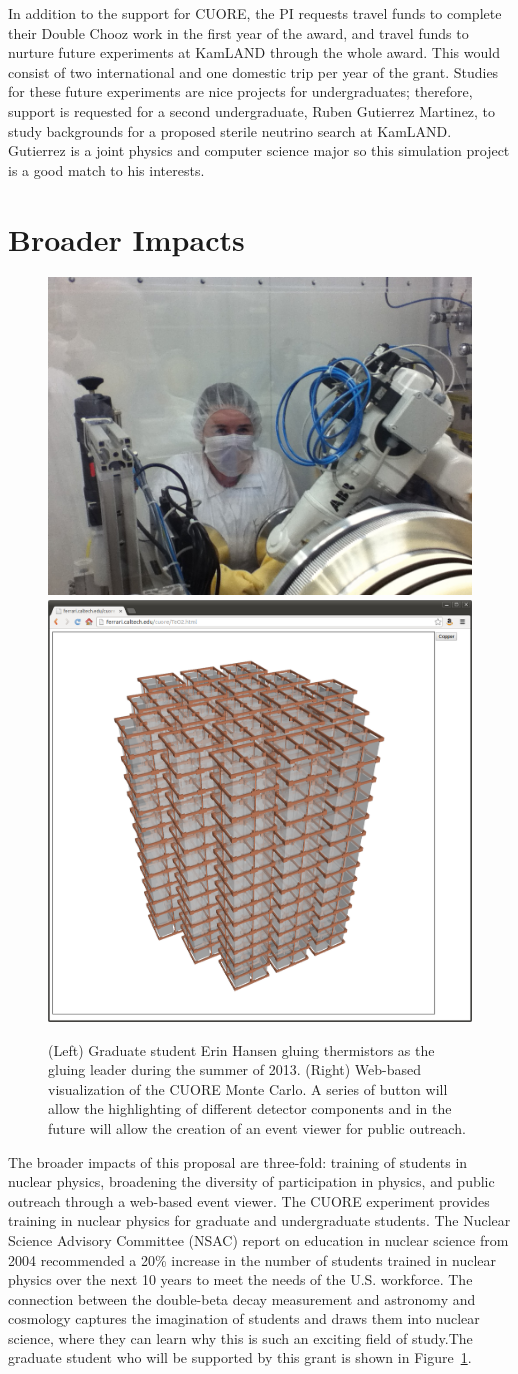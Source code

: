 In addition to the support for CUORE, the PI requests travel funds to complete their Double Chooz work in the first year of the award, and travel funds to nurture future experiments at KamLAND through the whole award. This would consist of two international and one domestic trip per year of the grant. Studies for these future experiments are nice projects for undergraduates; therefore, support is requested for a second undergraduate, Ruben Gutierrez Martinez, to study backgrounds for a proposed sterile neutrino search at KamLAND\cite{isodar}. Gutierrez is a joint physics and computer science major so this simulation project is a good match to his interests.

\section{Broader Impacts}

\begin{figure}
\begin{center}
\includegraphics[width=0.35\columnwidth]{figs/Erin1.jpg} 
\includegraphics[width=0.3\columnwidth]{figs/viewerPlain.png} 
\end{center}
\caption{\label{broad} (Left) Graduate student Erin Hansen gluing thermistors as the gluing leader during the summer of 2013. (Right) Web-based visualization of the CUORE Monte Carlo. A series of button will allow the highlighting of different detector components and in the future will allow the creation of an event viewer for public outreach. }
\end{figure}

The broader impacts of this proposal are three-fold: training of students in nuclear physics, broadening the diversity of participation in physics, and public outreach through a web-based event viewer. The CUORE experiment provides training in nuclear physics for graduate and undergraduate students. The Nuclear Science Advisory Committee (NSAC) report on education in nuclear science from 2004 recommended a 20\% increase in the number of students trained in nuclear physics over the next 10 years to meet the needs of the U.S. workforce\cite{nuced}. The connection between the double-beta decay measurement and astronomy and cosmology captures the imagination of students and draws them into nuclear science, where they can learn why this is such an exciting field of study.The graduate student who will be supported by this grant is shown in Figure~\ref{broad}.

